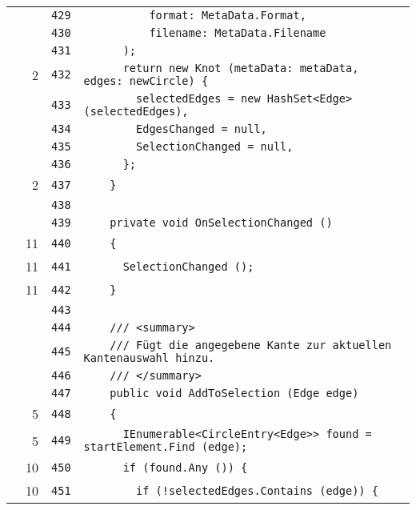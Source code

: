 \documentclass[a4paper,10pt]{article}
\begin{document}
\begin{longtable}[l]{lrrl}
\cellcolor{gray} &  & \verb~429~ & \verb~          format: MetaData.Format,~\\
\cellcolor{gray} &  & \verb~430~ & \verb~          filename: MetaData.Filename~\\
\cellcolor{gray} &  & \verb~431~ & \verb~      );~\\
\cellcolor{green} & 2 & \verb~432~ & \verb~      return new Knot (metaData: metaData, edges: newCircle) {~\\
\cellcolor{gray} &  & \verb~433~ & \verb~        selectedEdges = new HashSet<Edge> (selectedEdges),~\\
\cellcolor{gray} &  & \verb~434~ & \verb~        EdgesChanged = null,~\\
\cellcolor{gray} &  & \verb~435~ & \verb~        SelectionChanged = null,~\\
\cellcolor{gray} &  & \verb~436~ & \verb~      };~\\
\cellcolor{green} & 2 & \verb~437~ & \verb~    }~\\
\cellcolor{gray} &  & \verb~438~ & \verb~~\\
\cellcolor{gray} &  & \verb~439~ & \verb~    private void OnSelectionChanged ()~\\
\cellcolor{green} & 11 & \verb~440~ & \verb~    {~\\
\cellcolor{green} & 11 & \verb~441~ & \verb~      SelectionChanged ();~\\
\cellcolor{green} & 11 & \verb~442~ & \verb~    }~\\
\cellcolor{gray} &  & \verb~443~ & \verb~~\\
\cellcolor{gray} &  & \verb~444~ & \verb~    /// <summary>~\\
\cellcolor{gray} &  & \verb~445~ & \verb~    /// Fügt die angegebene Kante zur aktuellen Kantenauswahl hinzu.~\\
\cellcolor{gray} &  & \verb~446~ & \verb~    /// </summary>~\\
\cellcolor{gray} &  & \verb~447~ & \verb~    public void AddToSelection (Edge edge)~\\
\cellcolor{green} & 5 & \verb~448~ & \verb~    {~\\
\cellcolor{green} & 5 & \verb~449~ & \verb~      IEnumerable<CircleEntry<Edge>> found = startElement.Find (edge);~\\
\cellcolor{green} & 10 & \verb~450~ & \verb~      if (found.Any ()) {~\\
\cellcolor{green} & 10 & \verb~451~ & \verb~        if (!selectedEdges.Contains (edge)) {~\\

\end{longtable}
\end{document}
